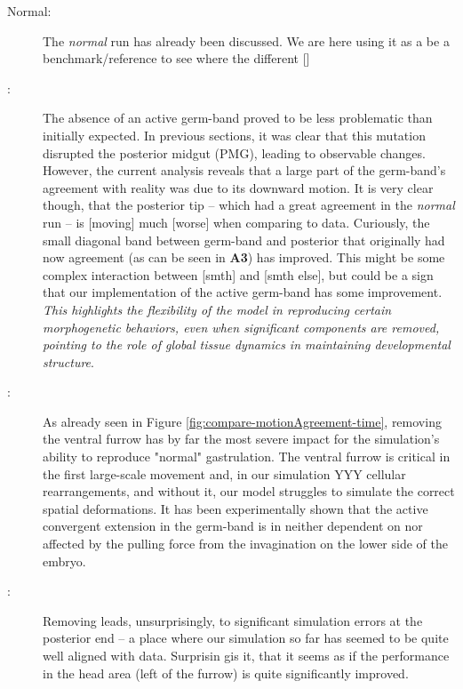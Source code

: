 \begin{description}
    \item[Normal:] The \textit{normal} run has already been discussed. We are here using it as a be a benchmark/reference to see where the different []
    \item[:] The absence of an active germ-band proved to be less problematic than initially expected. In previous sections, it was clear that this mutation disrupted the posterior midgut (PMG), leading to observable changes. However, the current analysis reveals that a large part of the germ-band's agreement with reality was due to its downward motion. It is very clear though, that the posterior tip --  which had a great agreement in the \textit{normal} run -- is [moving] much [worse] when comparing to data. Curiously, the small diagonal band between germ-band and posterior that originally had now agreement (as can be seen in \textbf{A3}) has improved. This might be some complex interaction between [smth] and [smth else], but could be a sign that our implementation of the active germ-band has some improvement. \textit{This highlights the flexibility of the model in reproducing certain morphogenetic behaviors, even when significant components are removed, pointing to the role of global tissue dynamics in maintaining developmental structure}.\\
    \item[:] As already seen in Figure \ref{fig:compare-motionAgreement-time}, removing the ventral furrow has by far the most severe impact for the simulation’s ability to reproduce "normal" gastrulation. The ventral furrow is critical in the first large-scale movement and, in our simulation YYY  cellular rearrangements, and without it, our model struggles to simulate the correct spatial deformations. It has been experimentally shown that the active convergent extension in the germ-band is in neither dependent on nor affected by the pulling force from the invagination on the lower side of the embryo.\cite{lye2024polarised} 
    \item[:] Removing  leads, unsurprisingly, to significant simulation errors at the posterior end -- a place where our simulation so far has seemed to be quite well aligned with data. Surprisin gis it, that it seems as if the performance in the head area (left of the  furrow) is quite significantly improved. 
\end{description}

